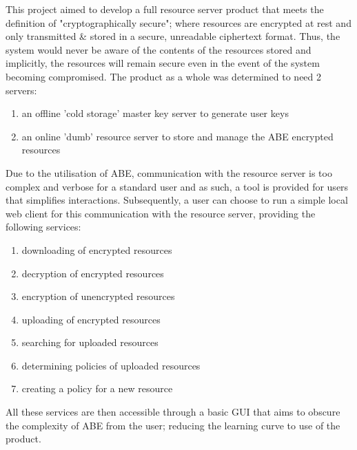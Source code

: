 This project aimed to develop a full resource server product that meets the definition of "cryptographically secure"; where resources are encrypted at rest and only transmitted \& stored in a secure, unreadable ciphertext format. Thus, the system would never be aware of the contents of the resources stored and implicitly, the resources will remain secure even in the event of the system becoming compromised. The product as a whole was determined to need 2 servers:
\begin{enumerate}
  \item an offline 'cold storage' master key server to generate user keys
  \item an online 'dumb' resource server to store and manage the ABE encrypted resources
\end{enumerate}
Due to the utilisation of ABE, communication with the resource server is too complex and verbose for a standard user and as such, a tool is provided for users that simplifies interactions. Subsequently, a user can choose to run a simple local web client for this communication with the resource server, providing the following services:
\begin{enumerate}
  \item downloading of encrypted resources
  \item decryption of encrypted resources
  \item encryption of unencrypted resources
  \item uploading of encrypted resources
  \item searching for uploaded resources
  \item determining policies of uploaded resources
  \item creating a policy for a new resource
\end{enumerate}
All these services are then accessible through a basic GUI that aims to obscure the complexity of ABE from the user; reducing the learning curve to use of the product.
